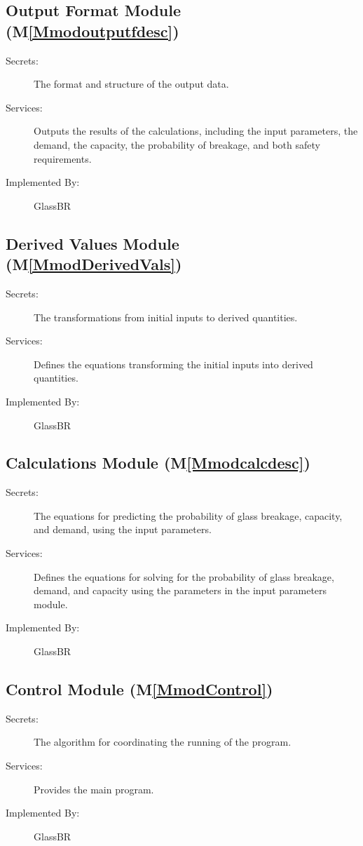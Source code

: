 \documentclass[12pt]{article}
\begin{document}
\subsection{Output Format Module (M\ref{Mmodoutputfdesc})}
\label{Sec:OFM()}
\begin{description}
\item[Secrets:]The format and structure of the output data.
\item[Services:]Outputs the results of the calculations, including the input parameters, the demand, the capacity, the probability of breakage, and both safety requirements.
\item[Implemented By:]GlassBR
\end{description}
\subsection{Derived Values Module (M\ref{MmodDerivedVals})}
\label{Sec:DVM()}
\begin{description}
\item[Secrets:]The transformations from initial inputs to derived quantities.
\item[Services:]Defines the equations transforming the initial inputs into derived quantities.
\item[Implemented By:]GlassBR
\end{description}
\subsection{Calculations Module (M\ref{Mmodcalcdesc})}
\label{Sec:CM()}
\begin{description}
\item[Secrets:]The equations for predicting the probability of glass breakage, capacity, and demand, using the input parameters.
\item[Services:]Defines the equations for solving for the probability of glass breakage, demand, and capacity using the parameters in the input parameters module.
\item[Implemented By:]GlassBR
\end{description}
\subsection{Control Module (M\ref{MmodControl})}
\label{Sec:CM()}
\begin{description}
\item[Secrets:]The algorithm for coordinating the running of the program.
\item[Services:]Provides the main program.
\item[Implemented By:]GlassBR
\end{description}
\end{document}
